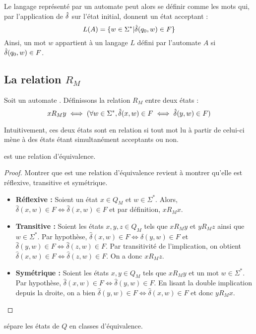 	 Le langage représenté par un automate \automaton peut alors se définir comme les mots qui, par l'application de $\hat{\delta}$ sur l'état initial, donnent un état acceptant :
	 $$
	 L(A)= \{w \in \Sigma^* | \hat{\delta}(q_0,w) \in F\}
	 $$
	 Ainsi, un mot $w$ appartient à un langage $L$ défini par l'automate $A$ si $\hat{\delta}(q_0,w) \in F$.	 
	 
	 \subsection{La relation $R_M$}\label{ss:rm}
	 
	 Soit un automate \automaton. Définissons la relation $R_M$ entre deux états : 
	 $$xR_My \iff (\forall w \in \Sigma^*,\hat{\delta}(x,w) \in F \iff \hat{\delta}(y,w) \in F)$$
	 
	 Intuitivement, ces deux états sont en relation si tout mot lu à partir de celui-ci mène à des états étant simultanément acceptants ou non. 
	 
	 \begin{proposition}
	 	\rm est une relation d'équivalence.
	 \end{proposition}
	
	 \begin{proof} Montrer que \rm est une relation d'équivalence revient à montrer qu'elle est réflexive, transitive et symétrique.
	 	\begin{itemize}
	 		\item \textbf{Réflexive :} Soient un état $x \in Q_M$ et $w \in \Sigma^*$. Alors, $\hat{\delta}(x,w) \in F \iff \hat{\delta}(x,w) \in F$ et par définition, $xR_Mx$.
	 		\item \textbf{Transitive :} Soient les états $x,y,z \in Q_M$ tels que $xR_My$ et $yR_Mz$ ainsi que $w \in \Sigma^*$. Par hypothèse, $\hat{\delta}(x,w) \in F \iff \hat{\delta}(y,w)\in F$ et $\hat{\delta}(y,w) \in F\iff \hat{\delta}(z,w) \in F$. Par transitivité de l'implication, on obtient $\hat{\delta}(x,w) \in F \iff \hat{\delta}(z,w)\in F$. On a donc $xR_Mz$.
	 		\item \textbf{Symétrique : } Soient les états $x,y \in Q_M$ tels que $xR_My$ et un mot $w \in \Sigma^*$. Par hypothèse, $\hat{\delta}(x, w)\in F \iff \hat{\delta}(y, w)\in F$. En lisant la double implication depuis la droite, on a bien $\hat{\delta}(y, w) \in F\iff \hat{\delta}(x, w)\in F$ et donc $yR_Mx$.
	 	\end{itemize}
	 \end{proof}
	 
	 \begin{corollary}
	 	\rm sépare les états de $Q$ en classes d'équivalence.
	 \end{corollary}
	 
